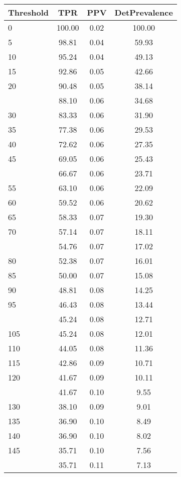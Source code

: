 \begin{table}[ht]
\centering
\begin{tabular}{lccc}
  \toprule
Threshold & TPR & PPV & DetPrevalence \\ 
  \midrule
0 & 100.00 & 0.02 & 100.00 \\ 
  5 & 98.81 & 0.04 & 59.93 \\ 
  10 & 95.24 & 0.04 & 49.13 \\ 
  15 & 92.86 & 0.05 & 42.66 \\ 
  20 & 90.48 & 0.05 & 38.14 \\ 
   \addlinespace
25 & 88.10 & 0.06 & 34.68 \\ 
  30 & 83.33 & 0.06 & 31.90 \\ 
  35 & 77.38 & 0.06 & 29.53 \\ 
  40 & 72.62 & 0.06 & 27.35 \\ 
  45 & 69.05 & 0.06 & 25.43 \\ 
   \addlinespace
50 & 66.67 & 0.06 & 23.71 \\ 
  55 & 63.10 & 0.06 & 22.09 \\ 
  60 & 59.52 & 0.06 & 20.62 \\ 
  65 & 58.33 & 0.07 & 19.30 \\ 
  70 & 57.14 & 0.07 & 18.11 \\ 
   \addlinespace
75 & 54.76 & 0.07 & 17.02 \\ 
  80 & 52.38 & 0.07 & 16.01 \\ 
  85 & 50.00 & 0.07 & 15.08 \\ 
  90 & 48.81 & 0.08 & 14.25 \\ 
  95 & 46.43 & 0.08 & 13.44 \\ 
   \addlinespace
100 & 45.24 & 0.08 & 12.71 \\ 
  105 & 45.24 & 0.08 & 12.01 \\ 
  110 & 44.05 & 0.08 & 11.36 \\ 
  115 & 42.86 & 0.09 & 10.71 \\ 
  120 & 41.67 & 0.09 & 10.11 \\ 
   \addlinespace
125 & 41.67 & 0.10 & 9.55 \\ 
  130 & 38.10 & 0.09 & 9.01 \\ 
  135 & 36.90 & 0.10 & 8.49 \\ 
  140 & 36.90 & 0.10 & 8.02 \\ 
  145 & 35.71 & 0.10 & 7.56 \\ 
   \addlinespace
150 & 35.71 & 0.11 & 7.13 \\ 

\end{tabular}
\end{table}
